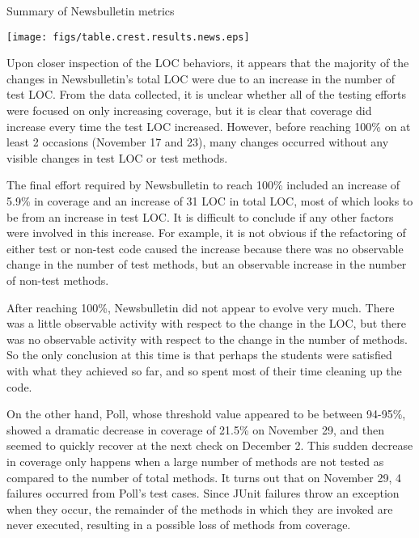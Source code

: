 \begin{table}[htbp]
  \begin{center}
    \caption{Summary of Newsbulletin metrics}
    \texttt{[image: figs/table.crest.results.news.eps]}
  \end{center}
\end{table}

Upon closer inspection of the LOC behaviors, it appears that the majority
of the changes in Newsbulletin's total LOC were due to an increase in the
number of test LOC. From the data collected, it is unclear whether all of
the testing efforts were focused on only increasing coverage, but it is
clear that coverage did increase every time the test LOC increased.
However, before reaching 100\% on at least 2 occasions (November 17 and
23), many changes occurred without any visible changes in test LOC or test
methods.

The final effort required by Newsbulletin to reach 100\% included an
increase of 5.9\% in coverage and an increase of 31 LOC in total LOC, most
of which looks to be from an increase in test LOC. It is difficult to
conclude if any other factors were involved in this increase.  For example,
it is not obvious if the refactoring of either test or non-test code caused
the increase because there was no observable change in the number of test
methods, but an observable increase in the number of non-test methods.

After reaching 100\%, Newsbulletin did not appear to evolve very much.
There was a little observable activity with respect to the change in the LOC,
but there was no observable activity with respect to the change in the
number of methods.  So the only conclusion at this time is that perhaps the
students were satisfied with what they achieved so far, and so spent most
of their time cleaning up the code.

On the other hand, Poll, whose threshold value appeared to be between
94-95\%, showed a dramatic decrease in coverage of 21.5\% on November 29,
and then seemed to quickly recover at the next check on December 2.  This
sudden decrease in coverage only happens when a large number of methods are
not tested as compared to the number of total methods.  It turns out that
on November 29, 4 failures occurred from Poll's test cases.  Since JUnit
failures throw an exception when they occur, the remainder of the methods
in which they are invoked are never executed, resulting in a possible loss
of methods from coverage.

